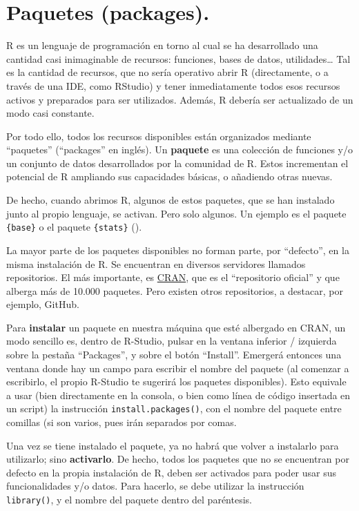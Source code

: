 \documentclass[
]{book}
\begin{document}
\section{Paquetes (packages).}\label{paquetes-packages.}

R es un lenguaje de programación en torno al cual se ha desarrollado una cantidad casi inimaginable de recursos: funciones, bases de datos, utilidades\ldots{} Tal es la cantidad de recursos, que no sería operativo abrir R (directamente, o a través de una IDE, como RStudio) y tener inmediatamente todos esos recursos activos y preparados para ser utilizados. Además, R debería ser actualizado de un modo casi constante.

Por todo ello, todos los recursos disponibles están organizados mediante ``paquetes'' (``packages'' en inglés). Un \textbf{paquete} es una colección de funciones y/o un conjunto de datos desarrollados por la comunidad de R. Estos incrementan el potencial de R ampliando sus capacidades básicas, o añadiendo otras nuevas.

De hecho, cuando abrimos R, algunos de estos paquetes, que se han instalado junto al propio lenguaje, se activan. Pero solo algunos. Un ejemplo es el paquete \texttt{\{base\}} o el paquete \texttt{\{stats\}} ().

La mayor parte de los paquetes disponibles no forman parte, por ``defecto'', en la misma instalación de R. Se encuentran en diversos servidores llamados repositorios. El más importante, es \href{https://cran.r-project.org/}{CRAN}, que es el ``repositorio oficial'' y que alberga más de 10.000 paquetes. Pero existen otros repositorios, a destacar, por ejemplo, GitHub.

Para \textbf{instalar} un paquete en nuestra máquina que esté albergado en CRAN, un modo sencillo es, dentro de R-Studio, pulsar en la ventana inferior / izquierda sobre la pestaña ``Packages'', y sobre el botón ``Install''. Emergerá entonces una ventana donde hay un campo para escribir el nombre del paquete (al comenzar a escribirlo, el propio R-Studio te sugerirá los paquetes disponibles). Esto equivale a usar (bien directamente en la consola, o bien como línea de código insertada en un script) la instrucción \texttt{install.packages()}, con el nombre del paquete entre comillas (si son varios, pues irán separados por comas.

Una vez se tiene instalado el paquete, ya no habrá que volver a instalarlo para utilizarlo; sino \textbf{activarlo}. De hecho, todos los paquetes que no se encuentran por defecto en la propia instalación de R, deben ser activados para poder usar sus funcionalidades y/o datos. Para hacerlo, se debe utilizar la instrucción \texttt{library()}, y el nombre del paquete dentro del paréntesis.
\end{document}
